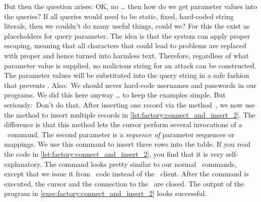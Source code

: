 But then the question arises:
OK, no  {\dots} then how do we get parameter values into the queries?
If all queries would need to be static, fixed, hard-coded string literals, then we couldn't do many useful things, could we?
For this the  exist as placeholders for query parameter.
The idea is that the system can apply proper escaping, meaning that all characters that could lead to problems are replaced with proper  and hence turned into harmless text.
Therefore, regardless of what parameter value is supplied, no malicious string for an attack can be constructed.
The parameter values will be substituted into the query string in a safe fashion that prevents .%
%
%
%
Also:~We should never hard-code usernames and passwords in our programs.
We did this here anyway {\dots} to keep the examples simple.
But seriously:~Don't do that.%
\endhsection
%
%
%
%
%
After inserting one record via the method~, we now use the  method to insert multiple records in \cref{lst:factory:connect_and_insert_2}.
The difference is that this method lets the cursor perform several invocations of a \sql\ command.
The second parameter is a \emph{sequence of} parameter sequences or mappings.
We use this command to insert three rows into the  table.
If you read the code in \cref{lst:factory:connect_and_insert_2}, you find that it is very self-explanatory.
The command looks pretty similar to our normal \sql\ commands, except that we issue it from \python\ code instead of the \psql\ client.%
%
After the command is executed, the cursor and the connection to the \db\ are closed.
The output of the program in \cref{exec:factory:connect_and_insert_2} looks successful.%
\FloatBarrier%
\endhsection%
%
%
%
%

